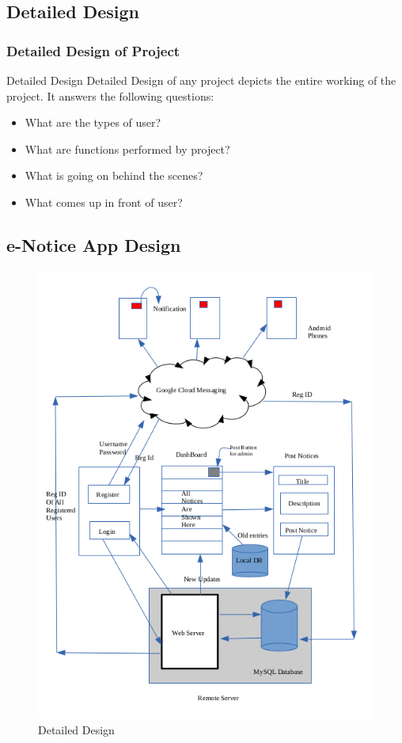 \documentclass{beamer}   %
\begin{document}
\subsection{Detailed Design}
\begin{frame}
\frametitle{Detailed Design of Project}
\begin{block}{Detailed Design}
Detailed Design of any project depicts the entire working of the project. It answers the following questions:
\begin{itemize}
\item What are the types of user?
\item What are functions performed by project?
\item What is going on behind the scenes?
\item What comes up in front of user? 
\end{itemize}
\end{block}
\end{frame}

\subsection{e-Notice App Design}
\begin{frame}[plain]

\begin{figure}
\includegraphics[scale=0.4]{image/detaildesign.png}
\caption{Detailed Design}
\end{figure}
\end{frame}
\end{document}
